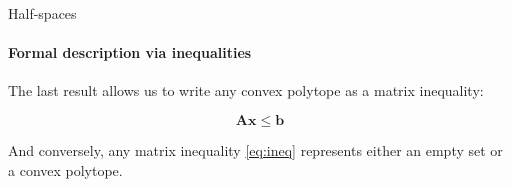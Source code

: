 \documentclass{beamer}
\begin{document}
\begin{frame}{Half-spaces}
\framesubtitle{Formal description via inequalities}
\begin{flushleft}

The last result allows us to write any convex polytope as a matrix inequality:

\begin{equation}
\label{eq:ineq} 
    \mathbf{A} \mathbf{x} \leq  \mathbf{b} 
\end{equation}

And conversely, any matrix inequality \eqref{eq:ineq} represents either an empty set or a convex polytope.
 
\end{flushleft}
\end{frame}
\end{document}
